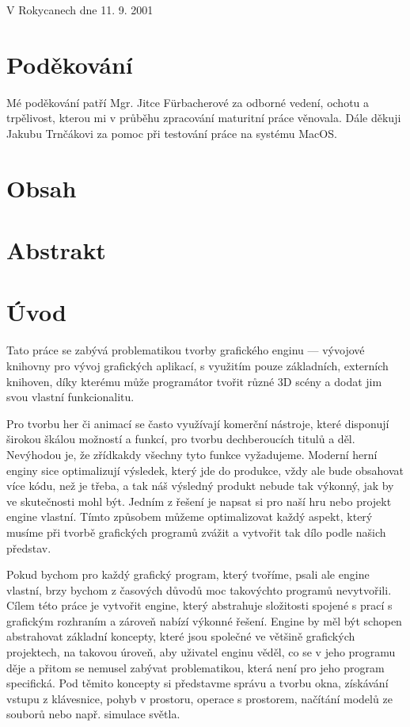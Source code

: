 \documentclass[12pt]{article}
\makeatletter
\renewcommand\tableofcontents{%
	\@starttoc{toc}%
}
\makeatother
\begin{document}
\vspace{24pt}
\noindent
V Rokycanech dne 11. 9. 2001
\pagebreak

\section*{Poděkování}

Mé poděkování patří Mgr. Jitce Fürbacherové za odborné vedení, ochotu a trpělivost, kterou mi v průběhu zpracování maturitní práce věnovala. Dále děkuji Jakubu Trnčákovi za pomoc při testování práce na systému MacOS.

\pagebreak

\section*{Obsah}
\tableofcontents
\pagebreak

\section*{Abstrakt}

\pagebreak

\section{Úvod}

Tato práce se zabývá problematikou tvorby grafického enginu — vývojové knihovny pro vývoj grafických aplikací, s využitím pouze základních, externích knihoven, díky kterému může programátor tvořit různé 3D scény a dodat jim svou vlastní funkcionalitu.

Pro tvorbu her či animací se často využívají komerční nástroje, které disponují širokou škálou možností a funkcí, pro tvorbu dechberoucích titulů a děl. Nevýhodou je, že zřídkakdy všechny tyto funkce vyžadujeme. Moderní herní enginy sice optimalizují výsledek, který jde do produkce, vždy ale bude obsahovat více kódu, než je třeba, a tak náš výsledný produkt nebude tak výkonný, jak by ve skutečnosti mohl být. Jedním z řešení je napsat si pro naší hru nebo projekt engine vlastní. Tímto způsobem můžeme optimalizovat každý aspekt, který musíme při tvorbě grafických programů zvážit a vytvořit tak dílo podle našich představ.

Pokud bychom pro každý grafický program, který tvoříme, psali ale engine vlastní, brzy bychom z časových důvodů moc takovýchto programů nevytvořili. Cílem této práce je vytvořit engine, který abstrahuje složitosti spojené s prací s grafickým rozhraním a zároveň nabízí výkonné řešení. Engine by měl být schopen abstrahovat základní koncepty, které jsou společné ve většině grafických projektech, na takovou úroveň, aby uživatel enginu věděl, co se v jeho programu děje a přitom se nemusel zabývat problematikou, která není pro jeho program specifická. Pod těmito koncepty si představme správu a tvorbu okna, získávání vstupu z klávesnice, pohyb v prostoru, operace s prostorem, načítání modelů ze souborů nebo např. simulace světla.
\end{document}
